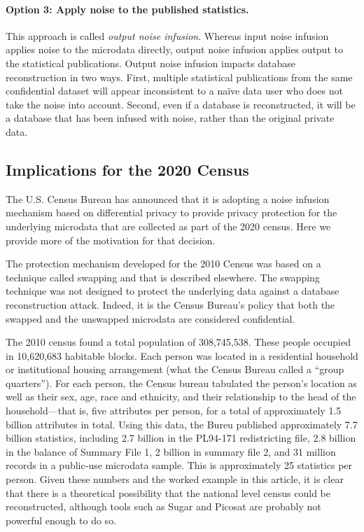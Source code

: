 \documentclass[runningheads]{llncs}
\begin{document}
\paragraph{Option 3: Apply noise to the published statistics.} This
approach is called \emph{output noise infusion}. Whereas input noise infusion
applies noise to the microdata directly, output noise infusion applies
output to the statistical publications.  Output noise infusion impacts
database reconstruction in two ways. First, multiple statistical
publications from the same confidential dataset will appear
inconsistent to a na\"ive data user who does not take the noise into
account. Second, even if a database is reconstructed, it will be a
database that has been infused with noise, rather than the original
private data. 


\subsection{Implications for the 2020 Census}

The U.S. Census Bureau has announced that it is adopting a noise
infusion mechanism based on differential privacy to provide privacy
protection for the underlying microdata that are collected as part of
the 2020 census. Here we provide more of the motivation for that
decision. 

The protection mechanism developed for the 2010 Census was based on a
technique called swapping and that is described
elsewhere\cite{swapping}. The swapping technique was not designed to
protect the underlying data against a database reconstruction
attack. Indeed, it is the Census Bureau's policy that both the swapped
and the unswapped microdata are considered confidential.

The 2010 census found a total population of 308,745,538. These people
occupied in 10,620,683 habitable blocks. Each person was located in a
residential household or institutional housing arrangement (what the
Census Bureau called a ``group quarters''). For each person, the Census
bureau tabulated the person's location as well as their sex, age,
race and ethnicity, and their relationship
to the head of the household---that is, five attributes per person,
for a total of approximately 1.5 billion attributes in total. Using
this data, the Bureu published approximately 7.7 billion statistics,
including 2.7 billion in the PL94-171 redistricting file, 2.8 billion
in the balance of Summary File 1, 2 billion in summary file 2, and 31
million records in a public-use microdata sample. This is
approximately 25 statistics per person. Given these numbers and the
worked example in this article, it is clear that there is a
theoretical possibility that the national level census could be
reconstructed, although tools such as Sugar and Picosat are probably
not powerful enough to do so.
\end{document}
